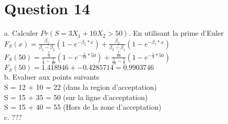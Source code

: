 \section{Question 14}

a. Calculer $Pr(S = 3X_1+10X_2 > 50)$. En utilisant la prime d'Euler\\
$F_S(x) = \frac{\beta_1}{\beta_1-\beta_2}(1-e^{-\beta_2*x}) +  \frac{\beta_2}{\beta_2-\beta_1}(1-e^{-\beta_1*x})$\\
$F_S(50) = \frac{\frac{1}{3}}{\frac{1}{3}-\frac{1}{10}}(1-e^{-\frac{1}{10}*50}) +  \frac{\frac{1}{10}}{\frac{1}{10}-\frac{1}{3}}(1-e^{-\frac{1}{3}*50})$\\
$F_S(50) = 1.418946 + -0.4285714 = 0.9903746$\\

b. Evaluer aux points suivants\\
S = 12 + 10 = 22 (dans la region d'acceptation)\\
S = 15 + 35 = 50 (sur la ligne d'acceptation)\\
S = 15 + 40 = 55 (Hors de la zone d'acceptation)\\

c. ???
